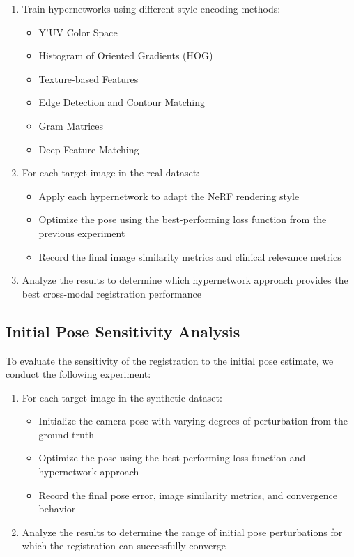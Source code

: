 \begin{enumerate}
    \item Train hypernetworks using different style encoding methods:
        \begin{itemize}
            \item Y'UV Color Space
            \item Histogram of Oriented Gradients (HOG)
            \item Texture-based Features
            \item Edge Detection and Contour Matching
            \item Gram Matrices
            \item Deep Feature Matching
        \end{itemize}
    \item For each target image in the real dataset:
        \begin{itemize}
            \item Apply each hypernetwork to adapt the NeRF rendering style
            \item Optimize the pose using the best-performing loss function from the previous experiment
            \item Record the final image similarity metrics and clinical relevance metrics
        \end{itemize}
    \item Analyze the results to determine which hypernetwork approach provides the best cross-modal registration performance
\end{enumerate}

\subsection{Initial Pose Sensitivity Analysis}
To evaluate the sensitivity of the registration to the initial pose estimate, we conduct the following experiment:

\begin{enumerate}
    \item For each target image in the synthetic dataset:
        \begin{itemize}
            \item Initialize the camera pose with varying degrees of perturbation from the ground truth
            \item Optimize the pose using the best-performing loss function and hypernetwork approach
            \item Record the final pose error, image similarity metrics, and convergence behavior
        \end{itemize}
    \item Analyze the results to determine the range of initial pose perturbations for which the registration can successfully converge
\end{enumerate}

